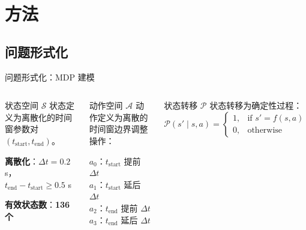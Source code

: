 \section{方法}

{\small

\subsection{问题形式化}

\begin{frame}{问题形式化：MDP 建模}
    \begin{columns}[T]
        \begin{block}{状态空间 $\mathcal{S}$}
            \scriptsize
            状态定义为离散化的时间窗参数对 $(t_{\text{start}}, t_{\text{end}})$\cite{blankertz2008optimizing}。
            
            \textbf{离散化}：$\Delta t = 0.2$ s，$t_{\text{end}} - t_{\text{start}} \geq 0.5$ s
            
            \textbf{有效状态数}：\textbf{136 个}
        \end{block}

        \begin{block}{动作空间 $\mathcal{A}$}
            \scriptsize
            动作定义为离散的时间窗边界调整操作：

            $a_0$：$t_{\text{start}}$ 提前 $\Delta t$\\
            $a_1$：$t_{\text{start}}$ 延后 $\Delta t$\\
            $a_2$：$t_{\text{end}}$ 提前 $\Delta t$\\
            $a_3$：$t_{\text{end}}$ 延后 $\Delta t$
        \end{block}

        \begin{block}{状态转移 $\mathcal{P}$}
            \scriptsize
            状态转移为确定性过程：
            \begin{equation*}
            \mathcal{P}(s' \mid s, a) =
            \begin{cases}
            1, & \text{if } s' = f(s, a) \\
            0, & \text{otherwise}
            \end{cases}
            \end{equation*}
        \end{block}


\end{columns}
\end{frame}}
